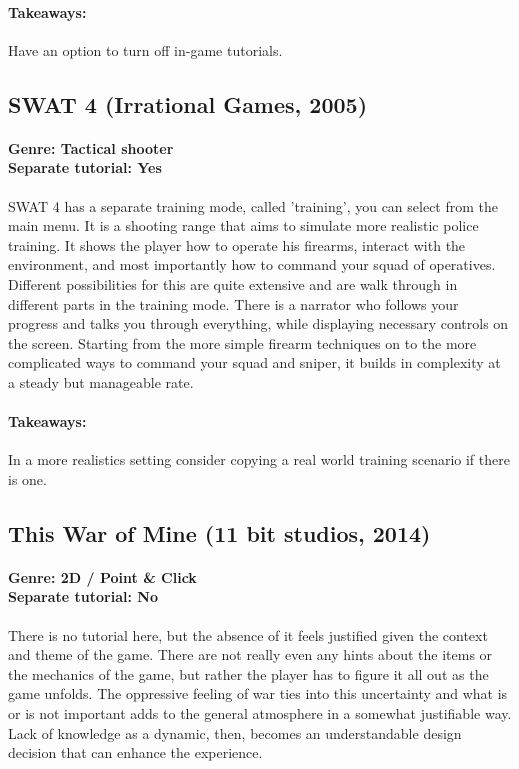 \paragraph{Takeaways:}
Have an option to turn off in-game tutorials.

\subsection{SWAT 4 (Irrational Games, 2005)}
\paragraph{Genre: Tactical shooter \\ Separate tutorial: Yes \\}
SWAT 4 has a separate training mode, called 'training', you can select from the main menu. It is a shooting range that aims to simulate more realistic police training. It shows the player how to operate his firearms, interact with the environment, and most importantly how to command your squad of operatives. Different possibilities for this are quite extensive and are walk through in different parts in the training mode. There is a narrator who follows your progress and talks you through everything, while displaying necessary controls on the screen. Starting from the more simple firearm techniques on to the more complicated ways to command your squad and sniper, it builds in complexity at a steady but manageable rate.
\paragraph{Takeaways:}
In a more realistics setting consider copying a real world training scenario if there is one.

\subsection{This War of Mine (11 bit studios, 2014)}
\paragraph{Genre: 2D / Point \& Click \\ Separate tutorial: No \\}
There is no tutorial here, but the absence of it feels justified given the context and theme of the game. There are not really even any hints about the items or the mechanics of the game, but rather the player has to figure it all out as the game unfolds. The oppressive feeling of war ties into this uncertainty and what is or is not important adds to the general atmosphere in a somewhat justifiable way. Lack of knowledge as a dynamic, then, becomes an understandable design decision that can enhance the experience.
